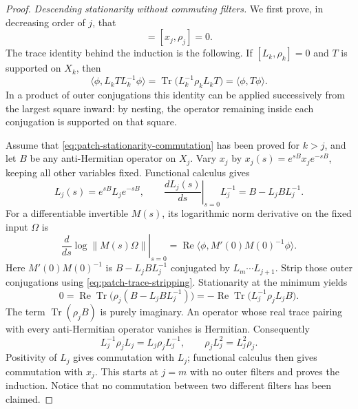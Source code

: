 \documentclass[11pt]{article}
\numberwithin{equation}{section}
\theoremstyle{definition}
\theoremstyle{remark}
\begin{document}
\begin{proof}
\emph{Descending stationarity without commuting filters.}
We first prove, in decreasing order of \(j\), that
\begin{equation}
 [L_j,\rho_j]=[x_j,\rho_j]=0.
 \label{eq:patch-stationarity-commutation}
\end{equation}
The trace identity behind the induction is the following.  If
\([L_k,\rho_k]=0\) and \(T\) is supported on \(X_k\), then
\begin{equation}
 \langle\phi,L_k T L_k^{-1}\phi\rangle
   =\operatorname{Tr}\bigl(L_k^{-1}\rho_k L_k T\bigr)
   =\langle\phi,T\phi\rangle .
 \label{eq:patch-trace-stripping}
\end{equation}
In a product of outer conjugations this identity can be applied
successively from the largest square inward: by nesting, the operator
remaining inside each conjugation is supported on that square.

Assume that \eqref{eq:patch-stationarity-commutation} has been proved
for \(k>j\), and let \(B\) be any anti-Hermitian operator on \(X_j\).
Vary \(x_j\) by \(x_j(s)=e^{sB}x_j e^{-sB}\), keeping all other
variables fixed.  Functional calculus gives
\[
 L_j(s)=e^{sB}L_j e^{-sB},\qquad
 \left.\frac{dL_j(s)}{ds}\right|_{s=0}L_j^{-1}
       =B-L_j B L_j^{-1}.
\]
For a differentiable invertible \(M(s)\), its logarithmic norm
derivative on the fixed input \(\Omega\) is
\[
 \left.\frac{d}{ds}\log\lVert M(s)\Omega\rVert\right|_{s=0}
   =\operatorname{Re}
       \langle\phi,M'(0)M(0)^{-1}\phi\rangle .
\]
Here \(M'(0)M(0)^{-1}\) is \(B-L_j B L_j^{-1}\) conjugated
by \(L_m\cdots L_{j+1}\).  Strip those outer conjugations using
\eqref{eq:patch-trace-stripping}.  Stationarity at the minimum yields
\[
 0=\operatorname{Re}\operatorname{Tr}\bigl(\rho_j(B-L_j B L_j^{-1})\bigr)
   =-\operatorname{Re}\operatorname{Tr}\bigl(L_j^{-1}\rho_jL_j B\bigr).
\]
The term \(\operatorname{Tr}(\rho_jB)\) is purely imaginary.  An operator whose
real trace pairing with every anti-Hermitian operator vanishes is
Hermitian.  Consequently
\[
 L_j^{-1}\rho_jL_j=L_j\rho_jL_j^{-1},
 \qquad
 \rho_jL_j^2=L_j^2\rho_j .
\]
Positivity of \(L_j\) gives commutation with \(L_j\); functional
calculus then gives commutation with \(x_j\).  This starts at \(j=m\)
with no outer filters and proves the induction.  Notice that no
commutation between two different filters has been claimed.


\end{proof}
\end{document}
